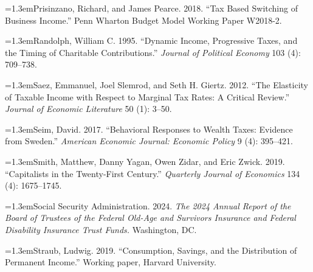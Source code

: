 \documentclass[10pt,twocolumn]{article}
\newcommand{\bibentry}{\par\hangindent=1.3em\noindent}
\begin{document}
{\bibentry Prisinzano, Richard, and James Pearce. 2018. ``Tax Based Switching
of Business Income.'' Penn Wharton Budget Model Working Paper W2018-2.

\bibentry Randolph, William C. 1995. ``Dynamic Income, Progressive Taxes, and
the Timing of Charitable Contributions.'' \emph{Journal of Political Economy}
103 (4): 709--738.

\bibentry Saez, Emmanuel, Joel Slemrod, and Seth H. Giertz. 2012. ``The
Elasticity of Taxable Income with Respect to Marginal Tax Rates: A Critical
Review.'' \emph{Journal of Economic Literature} 50 (1): 3--50.

\bibentry Seim, David. 2017. ``Behavioral Responses to Wealth Taxes: Evidence
from Sweden.'' \emph{American Economic Journal: Economic Policy} 9 (4):
395--421.

\bibentry Smith, Matthew, Danny Yagan, Owen Zidar, and Eric Zwick. 2019.
``Capitalists in the Twenty-First Century.'' \emph{Quarterly Journal of
Economics} 134 (4): 1675--1745.

\bibentry Social Security Administration. 2024. \emph{The 2024 Annual Report
of the Board of Trustees of the Federal Old-Age and Survivors Insurance and
Federal Disability Insurance Trust Funds.} Washington, DC.

\bibentry Straub, Ludwig. 2019. ``Consumption, Savings, and the Distribution
of Permanent Income.'' Working paper, Harvard University.
}
\end{document}
